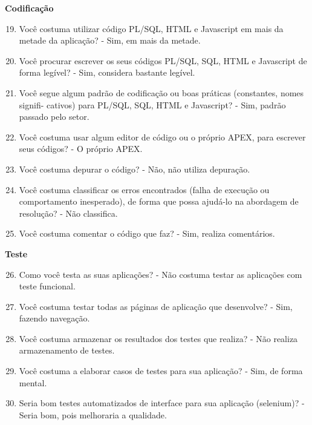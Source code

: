 \begin{apendicesenv}
\textbf{Codificação}

\begin{enumerate}
	\setcounter{enumi}{18}
	\item Você costuma utilizar código PL/SQL, HTML e Javascript em mais da metade da
	aplicação?\newline
	- Sim, em mais da metade.
	\item Você procurar escrever os seus códigos PL/SQL, SQL, HTML e Javascript de forma
	legível?\newline
	- Sim, considera bastante legível.
	\item Você segue algum padrão de codificação ou boas práticas (constantes, nomes signifi-
	cativos) para PL/SQL, SQL, HTML e Javascript?\newline
	- Sim, padrão passado pelo setor.
	\item Você costuma usar algum editor de código ou o próprio APEX, para escrever seus
	códigos?\newline
	- O próprio APEX.
	\item Você costuma depurar o código?\newline
	- Não, não utiliza depuração.
	\item Você costuma classificar os erros encontrados (falha de execução ou comportamento
	inesperado), de forma que possa ajudá-lo na abordagem de resolução?\newline
	- Não classifica.
	\item Você costuma comentar o código que faz?\newline
	- Sim, realiza comentários.
\end{enumerate}

\textbf{Teste}

\begin{enumerate}
	\setcounter{enumi}{25}
	\item Como você testa as suas aplicações?\newline
	- Não costuma testar as aplicações com teste funcional.
	\item Você costuma testar todas as páginas de aplicação que desenvolve?\newline
	- Sim, fazendo navegação.
	\item Você costuma armazenar os resultados dos testes que realiza?\newline
	- Não realiza armazenamento de testes.
	\item Você costuma a elaborar casos de testes para sua aplicação?\newline
	- Sim, de forma mental.
	\item Seria bom testes automatizados de interface para sua aplicação (selenium)?\newline
	- Seria bom, pois melhoraria a qualidade.
\end{enumerate}


\end{apendicesenv}

